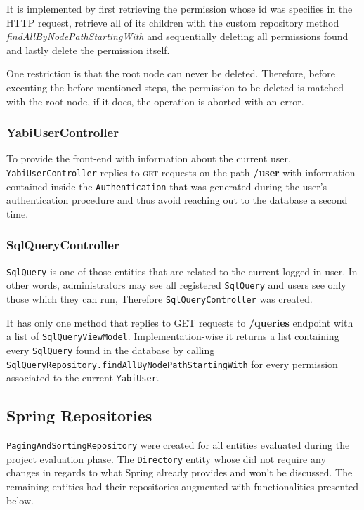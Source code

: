 It is implemented by first retrieving the permission whose id was specifies in the \gls{HTTP} request, retrieve all of its children with the custom repository method \textit{findAllByNodePathStartingWith} and sequentially deleting all permissions found and lastly delete the permission itself.

One restriction is that the root node can never be deleted. Therefore, before executing the before-mentioned steps, the permission to be deleted is matched with the root node, if it does, the operation is aborted with an error.

\subsubsection{YabiUserController}
To provide the front-end with information about the current user, \texttt{YabiUserController} replies to \textsc{get} requests on the path \textbf{/user} with information contained inside the \texttt{Authentication} that was generated during the user's authentication procedure and thus avoid reaching out to the database a second time.

\subsubsection{SqlQueryController}
\texttt{SqlQuery} is one of those entities that are related to the current logged-in user. In other words, administrators may see all registered \texttt{SqlQuery} and users see only those which they can run, Therefore \texttt{SqlQueryController} was created.

It has only one method that replies to \textsc{GET} requests to \textbf{/queries} endpoint with a list of \texttt{SqlQueryViewModel}. Implementation-wise it returns a list containing every \texttt{SqlQuery} found in the database by calling \texttt{SqlQueryRepository.findAllByNodePathStartingWith} for every permission associated to the current \texttt{YabiUser}.

\subsection{Spring Repositories}\label{impl:repos}
\texttt{PagingAndSortingRepository} were created for all entities evaluated during the project evaluation phase.
The \texttt{Directory} entity whose did not require any changes in regards to what Spring already provides and won't be discussed.
The remaining entities had their repositories augmented with functionalities presented below.

